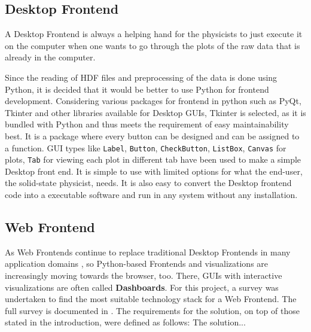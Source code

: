 \subsection{Desktop Frontend}
\label{sec:desktop-frontend}

A Desktop Frontend is always a helping hand for the physicists to just execute
it on the computer when one wants to go through the plots of the raw data that
is already in the computer.

Since the reading of HDF files and preprocessing of the data is done using
Python, it is decided that it would be better to use Python for frontend
development. Considering various packages for frontend in python such as PyQt,
Tkinter and other libraries available for Desktop GUIs, Tkinter is selected, as
it is bundled with Python and thus meets the requirement of easy maintainability
best. It is a package where every button can be designed and can be assigned to
a function. GUI types like \texttt{Label}, \texttt{Button},
\texttt{CheckButton}, \texttt{ListBox}, \texttt{Canvas} for plots, \texttt{Tab}
for viewing each plot in different tab have been used to make a simple Desktop
front end. It is simple to use with limited options for what the end-user, the
solid-state physicist, needs. It is also easy to convert the Desktop frontend
code into a executable software and run in any system without any installation.

\subsection{Web Frontend}
\label{sec:web-frontend}

As Web Frontends continue to replace traditional Desktop Frontends in many
application domains \cite{web-vs-desktop}, so Python-based Frontends and
visualizations are increasingly moving towards the browser, too. There, GUIs
with interactive visualizations are often called \textbf{Dashboards}. For this
project, a survey was undertaken to find the most suitable technology stack for
a Web Frontend. The full survey is documented in \cite{jw-notes}. The
requirements for the solution, on top of those stated in the introduction, were
defined as follows: The solution...

